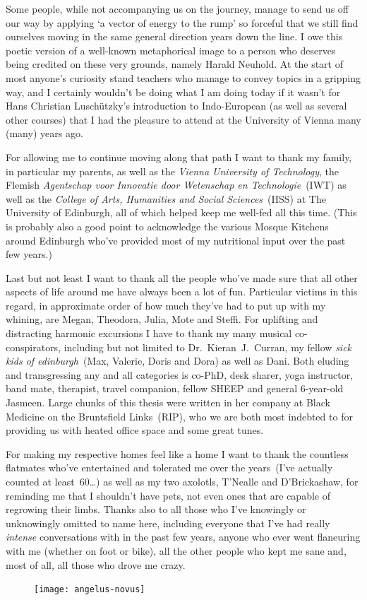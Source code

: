 \documentclass[twoside,10pt]{book}
\begin{document}
Some people, while not accompanying us on the journey, manage to send us off our way by applying `a vector of energy to the rump' so forceful that we still find ourselves moving in the same general direction years down the line.
I owe this poetic version of a well-known metaphorical image to a person who deserves being credited on these very grounds, namely Harald Neuhold. At the start of most anyone's curiosity stand teachers who manage to convey topics in a gripping way, and I certainly wouldn't be doing what I am doing today if it wasn't for Hans Christian Luschützky's introduction to Indo-European (as well as several other courses) that I had the pleasure to attend at the University of Vienna many (many) years ago.

For allowing me to continue moving along that path I want to thank my family, in particular my parents, as well as the \emph{Vienna University of Technology}, the Flemish \emph{Agentschap voor Innovatie door Wetenschap en Technologie}~(IWT) as well as the \emph{College of Arts, Humanities and Social Sciences}~(HSS) at The University of Edinburgh, all of which helped keep me well-fed all this time. (This is probably also a good point to acknowledge the various Mosque Kitchens around Edinburgh who've provided most of my nutritional input over the past few years.)

Last but not least I want to thank all the people who've made sure that all other aspects of life around me have always been a lot of fun. Particular victims in this regard, in approximate order of how much they've had to put up with my whining, are Megan, Theodora, Julia, Mote and Steffi.
For uplifting and distracting harmonic excursions I have to thank my many musical co-conspirators, including but not limited to Dr.~Kieran~J.~Curran, my fellow \emph{sick kids of edinburgh}~(Max, Valerie, Doris and Dora) as well as Dani.
Both eluding and transgressing any and all categories is co-PhD, desk sharer, yoga instructor, band mate, therapist, travel companion, fellow SHEEP and general 6-year-old Jasmeen. Large chunks of this thesis were written in her company at Black Medicine on the Bruntsfield Links~(RIP), who we are both most indebted to for providing us with heated office space and some great tunes.

For making my respective homes feel like a home I want to thank the countless flatmates who've entertained and tolerated me over the years~(I've actually counted at least~60\ldots) as well as my two axolotls, T'Nealle and D'Brickashaw, for reminding me that I shouldn't have pets, not even ones that are capable of regrowing their limbs. Thanks also to all those who I've knowingly or unknowingly omitted to name here, including everyone that I've had really \emph{intense} conversations with in the past few years, anyone who ever went flaneuring with me (whether on foot or bike), all the other people who kept me sane and, most of all, all those who drove me crazy.
\begin{figure}[p]
\centering
\texttt{[image: angelus-novus]}
\end{figure}
\end{document}

